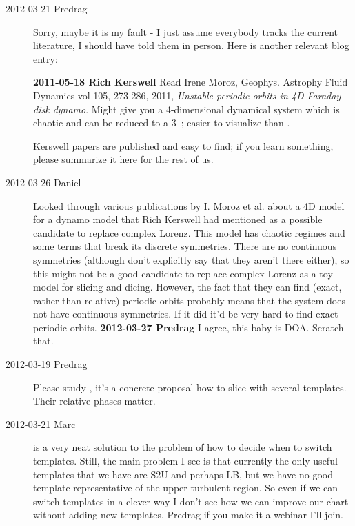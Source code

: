 \begin{description}
\item[2012-03-21 Predrag]
Sorry, maybe it is my fault - I just assume everybody tracks the current
literature, I should have told them in person. Here is another relevant
blog entry:

{\bf 2011-05-18  Rich Kerswell} Read Irene Moroz, Geophys. Astrophy Fluid
Dynamics vol 105, 273-286, 2011, \emph{Unstable periodic orbits in 4D
Faraday disk dynamo}. Might give you a 4-dimensional dynamical system
which is chaotic and can be reduced to a 3\dmn\ \statesp; easier to
visualize than {\cLf}.

Kerswell papers are published and easy to find; if you learn something,
please summarize it here for the rest of us.

\item[2012-03-26 Daniel] Looked through various publications by I. Moroz
et al. about a 4D model for a dynamo model that Rich Kerswell had
mentioned as a possible candidate to replace complex Lorenz. This model
has chaotic regimes and some terms that break its discrete symmetries.
There are no continuous symmetries (although don't explicitly say that
they aren't there either), so this might not be a good candidate to
replace complex Lorenz as a toy model for slicing and dicing. However,
the fact that they can find (exact, rather than relative) periodic orbits
probably means that the system does not have continuous symmetries. If it
did it'd be very hard to find exact periodic orbits.
{\bf 2012-03-27 Predrag} I agree, this baby is DOA. Scratch that.


\item[2012-03-19 Predrag~~] Please study , it's a
concrete proposal how to slice with several templates. Their relative
phases matter.

\item[2012-03-21 Marc~~]  is a very neat solution
to the problem of how to decide when to switch templates. Still, the
main problem I see is that currently the only useful templates that we
have are S2U and perhaps LB, but we have no good template
representative of the upper turbulent region. So even if we can switch
templates in a clever way I don't see how we can improve our chart without
adding new templates. Predrag if you make it a webinar I'll join.


\end{description}
